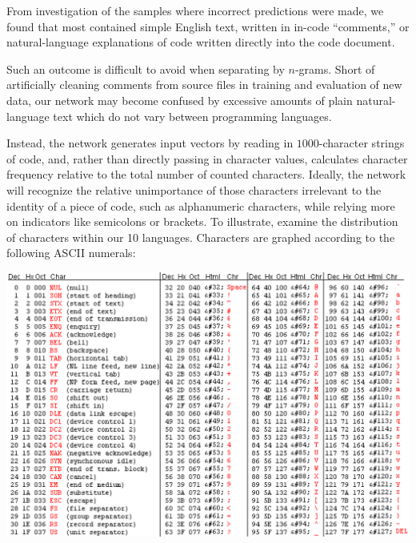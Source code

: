 \documentclass{article}
\begin{document}
From investigation of the samples where incorrect predictions were made, we found that most contained simple English text, written in in-code ``comments,'' or natural-language explanations of code written directly into the code document.

Such an outcome is difficult to avoid when separating by $n$-grams. Short of artificially cleaning comments from source files in training and evaluation of new data, our network may become confused by excessive amounts of plain natural-language text which do not vary between programming languages.

Instead, the network generates input vectors by reading in $1000$-character strings of code, and, rather than directly passing in character values, calculates character frequency relative to the total number of counted characters. Ideally, the network will recognize the relative unimportance of those characters irrelevant to the identity of a piece of code, such as alphanumeric characters, while relying more on indicators like semicolons or brackets. To illustrate, examine the distribution of characters within our 10 languages. Characters are graphed according to the following ASCII numerals:

\begin{center}
    \includegraphics{asciitable}
\end{center}
\end{document}
